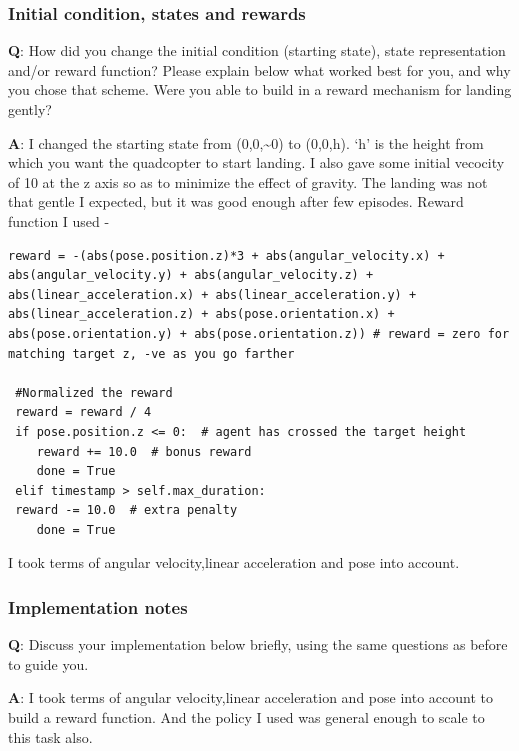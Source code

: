 \documentclass[11pt]{article}
\begin{document}
\hypertarget{initial-condition-states-and-rewards}{%
\subsubsection{Initial condition, states and
rewards}\label{initial-condition-states-and-rewards}}

\textbf{Q}: How did you change the initial condition (starting state),
state representation and/or reward function? Please explain below what
worked best for you, and why you chose that scheme. Were you able to
build in a reward mechanism for landing gently?

\textbf{A}: I changed the starting state from (0,0,\textasciitilde{}0)
to (0,0,h). `h' is the height from which you want the quadcopter to
start landing. I also gave some initial vecocity of 10 at the z axis so
as to minimize the effect of gravity. The landing was not that gentle I
expected, but it was good enough after few episodes. Reward function I
used -

\begin{verbatim}
reward = -(abs(pose.position.z)*3 + abs(angular_velocity.x) + abs(angular_velocity.y) + abs(angular_velocity.z) + abs(linear_acceleration.x) + abs(linear_acceleration.y) + abs(linear_acceleration.z) + abs(pose.orientation.x) + abs(pose.orientation.y) + abs(pose.orientation.z)) # reward = zero for matching target z, -ve as you go farther

 #Normalized the reward
 reward = reward / 4
 if pose.position.z <= 0:  # agent has crossed the target height
    reward += 10.0  # bonus reward
    done = True
 elif timestamp > self.max_duration:
 reward -= 10.0  # extra penalty
    done = True
\end{verbatim}

I took terms of angular velocity,linear acceleration and pose into
account.

\hypertarget{implementation-notes}{%
\subsubsection{Implementation notes}\label{implementation-notes}}

\textbf{Q}: Discuss your implementation below briefly, using the same
questions as before to guide you.

\textbf{A}: I took terms of angular velocity,linear acceleration and
pose into account to build a reward function. And the policy I used was
general enough to scale to this task also.
\end{document}
